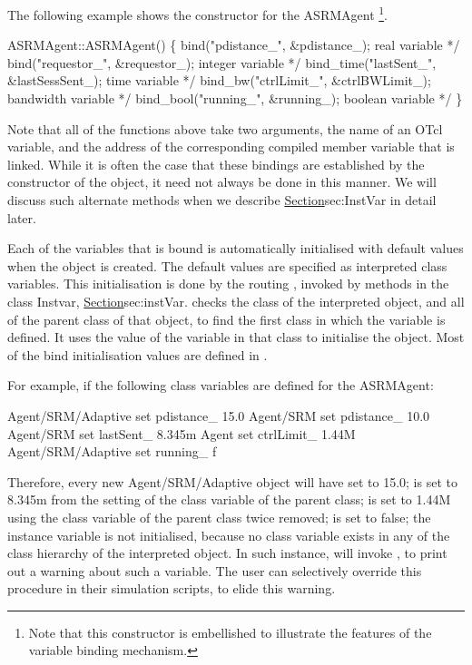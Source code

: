 The following example shows the constructor for the ASRMAgent%
\footnote{Note that this constructor is embellished to illustrate
        the features of the variable binding mechanism.}.
\begin{program}
        ASRMAgent::ASRMAgent() \{
                bind("pdistance_", &pdistance_);      \* real variable */
                bind("requestor_", &requestor_);      \* integer variable */
                bind_time("lastSent_", &lastSessSent_); \* time variable */
                bind_bw("ctrlLimit_", &ctrlBWLimit_); \* bandwidth variable */
                bind_bool("running_", &running_);     \* boolean variable */
        \}
\end{program}
Note that all of the functions above take two arguments,
the name of an OTcl variable,
and the address of the corresponding compiled member variable
that is linked.
While it is often the case that these bindings are established
by the constructor of the object, 
it need not always be done in this manner.
We will discuss such alternate methods
when we describe \href{the class InstVar}{Section}{sec:InstVar}
in detail later.

Each of the variables that is bound is automatically initialised
with default values when the object is created.
The default values are specified as interpreted class variables.
This initialisation is done by the routing ,
invoked by methods in the class Instvar,
\href{described later}{Section}{sec:instVar}.
 checks the class of the interpreted object,
and all of the parent class of that object, to find the first
class in which the variable is defined.
It uses the value of the variable in that class to initialise the object.
Most of the bind initialisation values are defined in
.

For example, if the following class variables are defined for the ASRMAgent:
\begin{program}
        Agent/SRM/Adaptive set pdistance_ 15.0
        Agent/SRM set pdistance_ 10.0
        Agent/SRM set lastSent_ 8.345m
        Agent set ctrlLimit_    1.44M
        Agent/SRM/Adaptive set running_ f
\end{program}
Therefore, every new Agent/SRM/Adaptive object will have
 set to 15.0;
 is set to 8.345m
from the setting of the class variable of the parent class;
 is set to 1.44M
using the class variable of the parent class twice removed;
 is set to false;
the instance variable  is not initialised,
because no class variable
exists in any of the class hierarchy of the interpreted object.
In such instance,  will invoke 
, to print out a warning about such a variable.
The user can selectively override this procedure
in their simulation scripts, to elide this warning.

